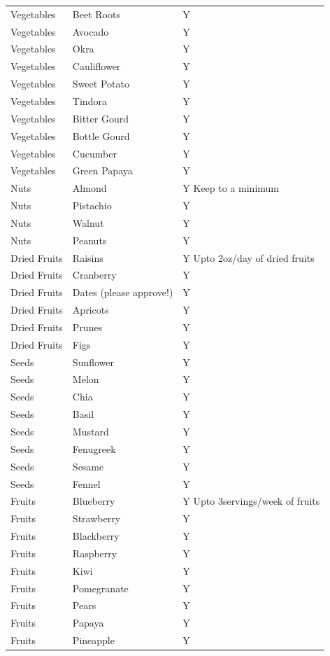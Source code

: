 \documentclass[
  oneside]{book}
\begin{document}
\begin{longtable}[t]{lll}
Vegetables & Beet Roots & Y\\
Vegetables & Avocado & Y\\
Vegetables & Okra & Y\\
Vegetables & Cauliflower & Y\\
Vegetables & Sweet Potato & Y\\
\addlinespace
Vegetables & Tindora & Y\\
Vegetables & Bitter Gourd & Y\\
Vegetables & Bottle Gourd & Y\\
Vegetables & Cucumber & Y\\
Vegetables & Green Papaya & Y\\
\addlinespace
Nuts & Almond & Y
Keep to a minimum\\
Nuts & Pistachio & Y\\
Nuts & Walnut & Y\\
Nuts & Peanuts & Y\\
Dried Fruits & Raisins & Y
Upto 2oz/day of dried fruits\\
\addlinespace
Dried Fruits & Cranberry & Y\\
Dried Fruits & Dates (please approve!) & Y\\
Dried Fruits & Apricots & Y\\
Dried Fruits & Prunes & Y\\
Dried Fruits & Figs & Y\\
\addlinespace
Seeds & Sunflower & Y\\
Seeds & Melon & Y\\
Seeds & Chia & Y\\
Seeds & Basil & Y\\
Seeds & Mustard & Y\\
\addlinespace
Seeds & Fenugreek & Y\\
Seeds & Sesame & Y\\
Seeds & Fennel & Y\\
Fruits & Blueberry & Y
Upto 3servings/week of fruits\\
Fruits & Strawberry & Y\\
\addlinespace
Fruits & Blackberry & Y\\
Fruits & Raspberry & Y\\
Fruits & Kiwi & Y\\
Fruits & Pomegranate & Y\\
Fruits & Pears & Y\\
\addlinespace
Fruits & Papaya & Y\\
Fruits & Pineapple & Y\\

\end{longtable}
\end{document}
